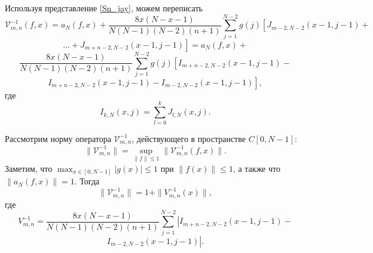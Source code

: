 \documentclass[12pt]{book}
\begin{document}
Используя представление \eqref{Sn_jay}, можем переписать
\begin{equation*}
  \mathcal{V}^{-1}_{m,n}(f,x) = a_N(f,x) + %
  \frac{8x(N-x-1)}{N(N-1)(N-2)(n+1)}
   \sum_{j=1}^{N-2} g(j) \left[ J_{m-2,N-2}(x-1,j-1) + \right.
\end{equation*}
\begin{equation*}
  \left.\ldots + J_{m+n-2,N-2}(x-1,j-1) \right] = a_N(f,x) +
\end{equation*}
\begin{equation*}
   \frac{8x(N-x-1)}{N(N-1)(N-2)(n+1)}
   \sum_{j=1}^{N-2} g(j) \left[ I_{m+n-2,N-2}(x-1,j-1) -  \right.
\end{equation*}
\begin{equation} \label{limVPf}
 \left. I_{m+n-2,N-2}(x-1,j-1) - I_{m-2,N-2}(x-1,j-1) \right],
\end{equation}
где
\begin{equation}\label{I}
  I_{k,N}(x,j) = \sum_{l=0}^{k} J_{l,N}(x,j).
\end{equation}



Рассмотрим норму оператора $\mathcal{V}^{-1}_{m,n}$, действующего  в пространстве $C[0, N-1]$:
\begin{equation}\label{norm}
  \| \mathcal{V}^{-1}_{m,n} \| = \sup_{\| f \| \leq 1} \| \mathcal{V}^{-1}_{m,n}(f,x) \|.
\end{equation}
Заметим, что $\max_{x \in [0,N-1]} |g(x)| \leq 1$ при $\| f(x) \| \leq 1$, а также что $\| a_N(f,x) \| = 1$. Тогда
\begin{equation}\label{norm2}
  \| \mathcal{V}^{-1}_{m,n} \| = 1 + \| {V}^{-1}_{m,n}(x) \|,
\end{equation}
где
\begin{equation*}
   V^{-1}_{m,n}  = \frac{8x(N-x-1)}{N(N-1)(N-2)(n+1)}
   \sum_{j=1}^{N-2} \left| I_{m+n-2,N-2}(x-1,j-1) - \right.
\end{equation*}
\begin{equation}\label{norm2}
   \left. I_{m-2,N-2}(x-1,j-1) \right|.
\end{equation}
\end{document}
